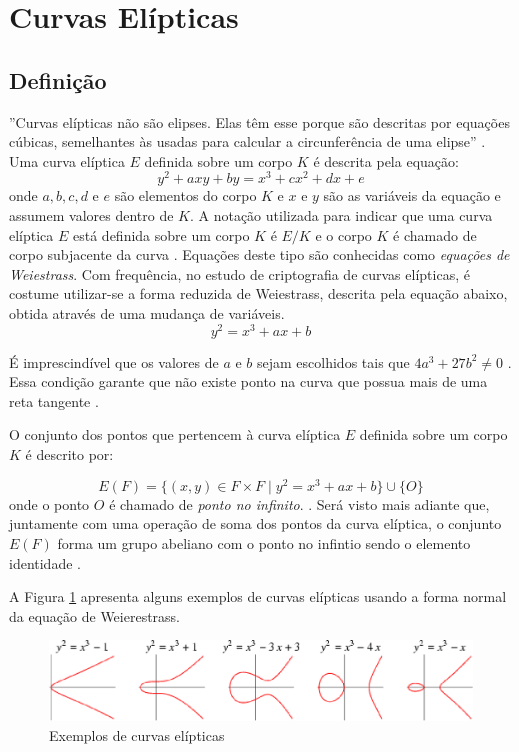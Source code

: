 %
%
\section{Curvas Elípticas}

\subsection{Definição}
''Curvas elípticas não são elipses. Elas têm esse porque são descritas por equações cúbicas, semelhantes às usadas para calcular a circunferência de uma elipse'' \cite{Stallings:2011}. Uma curva elíptica $E$ definida sobre um corpo $K$ é descrita pela equação:
\begin{equation}
y^2 + axy + by = x^3 + cx^2 + dx + e \label{eq:5}
\end{equation}
onde \(a, b, c, d\) e \(e\) são elementos do corpo $K$ e \(x\) e \(y\) são as variáveis da equação e assumem valores dentro de $K$. A notação utilizada para indicar que uma curva elíptica $E$ está definida sobre um corpo $K$ é $E/K$ e o corpo $K$ é chamado de corpo subjacente da curva \cite{Hankerson:2004}. Equações deste tipo são conhecidas como \textit{equações de Weiestrass}. Com frequência, no estudo de criptografia de curvas elípticas, é costume utilizar-se a forma reduzida de Weiestrass, descrita pela equação abaixo, obtida através de uma mudança de variáveis.
\begin{equation}
y^2 = x^3 + ax + b \label{eq:6}
\end{equation}

É imprescindível que os valores de $a$ e $b$ sejam escolhidos tais que $4a^3 + 27b^2 \ne 0$ \cite{Mandy:2007}. Essa condição garante que não existe ponto na curva que possua mais de uma reta tangente \cite{Hankerson:2004}.

O conjunto dos pontos que pertencem à curva elíptica $E$ definida sobre um corpo $K$ é descrito por:

$$ E(F) = \{(x,y) \in F \times F \mid y^2 = x^3 + ax + b\} \cup \{O\} $$
onde o ponto ${O}$ é chamado de \textit{ponto no infinito}. \cite{Mandy:2007}.
Será visto mais adiante que, juntamente com uma operação de soma dos pontos da curva elíptica, o conjunto $E(F)$ forma um grupo abeliano com o ponto no infintio sendo o elemento identidade \cite{Hankerson:2004}.

A Figura \ref{fig:curvas} apresenta alguns exemplos de curvas elípticas usando a forma normal da equação de Weierestrass.

\begin{figure}[h]
\centering
\includegraphics[scale=0.5, bb=0 0 529 101]{figuras/curvas.eps}
\caption{Exemplos de curvas elípticas}
\label{fig:curvas}
\end{figure}

